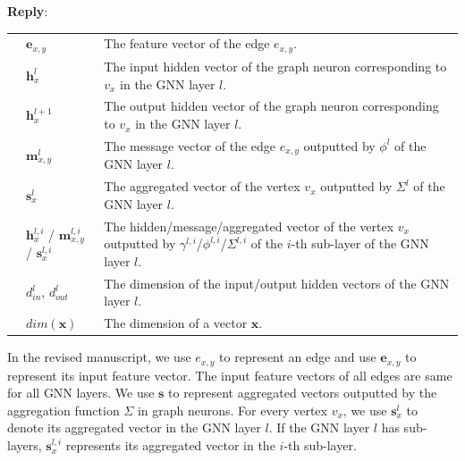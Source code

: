 \documentclass[12pt]{article}
\newcommand{\MyVec}[1]{\boldsymbol{#1}}
\newenvironment{reply}
   {\medskip \noindent \textbf{Reply}:\  }
   {\medskip}
\begin{document}
\begin{reply}
\begin{table}[H]
\begin{tabular}{p{3em}lp{35em}}
        & $\boldsymbol{e}_{x,y}$ & The feature vector of the edge $e_{x,y}$.  \\
        & $\boldsymbol{h}_x^{l}$ &  The {input} hidden vector of the graph neuron corresponding to $v_x$ in the GNN layer $l$. \\
        & $\boldsymbol{h}_x^{l+1}$ &  The {output} hidden vector of the graph neuron corresponding to $v_x$ in the GNN layer $l$.\\
        & $\boldsymbol{m}_{x,y}^l$ & The message vector of the edge $e_{x,y}$ outputted by $\phi^l$ of the GNN layer $l$. \\
        & $\boldsymbol{s}_{x}^l$ & The aggregated vector of the vertex $v_x$ outputted by $\Sigma^l$ of the GNN layer $l$. \\
        & $\boldsymbol{h}_{x}^{l,i}$ / $\boldsymbol{m}_{x,y}^{l,i}$ / $\boldsymbol{s}_{x}^{l,i}$ & The hidden/message/aggregated vector of the vertex $v_x$ outputted by $\gamma^{l,i}$/$\phi^{l,i}$/$\Sigma^{l,i}$ of the $i$-th sub-layer of the GNN layer $l$. \\
        & $d^l_{in}$, $d^l_{out}$ &  The dimension of the input/output hidden vectors of the GNN layer $l$. \\
        & $dim(\MyVec{x})$ & The dimension of a vector $\MyVec{x}$. \\
        \bottomrule
    \end{tabular}
\end{table}

    
    In the revised manuscript, we use $e_{x,y}$ to represent an edge and use $\boldsymbol{e}_{x,y}$ to represent its input feature vector.
    The input feature vectors of all edges are same for all GNN layers.
    We use $\boldsymbol{s}$ to represent aggregated vectors outputted by the aggregation function $\Sigma$ in graph neurons.
    For every vertex $v_x$, we use $\boldsymbol{s}^l_x$ to denote its aggregated vector in the GNN layer $l$.
    If the GNN layer $l$ has sub-layers, $\boldsymbol{s}^{l,i}_x$ represents its aggregated vector in the $i$-th sub-layer.
    

\end{reply}
\end{document}
